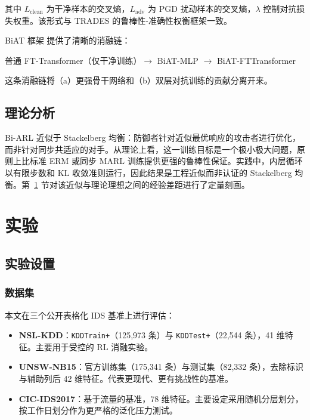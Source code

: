 \documentclass[12pt,a4paper]{ctexart}
\begin{document}
其中 $L_{\text{clean}}$ 为干净样本的交叉熵，$L_{\text{adv}}$ 为 PGD 扰动样本的交叉熵，$\lambda$ 控制对抗损失权重。该形式与 TRADES 的鲁棒性-准确性权衡框架一致。

BiAT 框架 提供了清晰的消融链：
\begin{center}
普通 FT-Transformer（仅干净训练）$\to$ BiAT-MLP $\to$ BiAT-FTTransformer
\end{center}

这条消融链将（a）更强骨干网络和（b）双层对抗训练的贡献分离开来。

\subsection{理论分析}

Bi-ARL 近似于 Stackelberg 均衡：防御者针对近似最优响应的攻击者进行优化，而非针对同步共适应的对手。从理论上看，这一训练目标是一个极小极大问题，原则上比标准 ERM 或同步 MARL 训练提供更强的鲁棒性保证。实践中，内层循环以有限步数和 KL 收敛准则运行，因此结果是工程近似而非认证的 Stackelberg 均衡。第~\ref{sec:experiments_cn} 节对该近似与理论理想之间的经验差距进行了定量刻画。

\section{实验}
\label{sec:experiments_cn}

\subsection{实验设置}

\subsubsection{数据集}

本文在三个公开表格化 IDS 基准上进行评估：
\begin{itemize}
    \item \textbf{NSL-KDD}：\texttt{KDDTrain+}（125,973 条）与 \texttt{KDDTest+}（22,544 条），41 维特征\cite{tavallaee2009nslkdd}。主要用于受控的 RL 消融实验。
    \item \textbf{UNSW-NB15}：官方训练集（175,341 条）与测试集（82,332 条），去除标识与辅助列后 42 维特征\cite{moustafa2015unswnb15}。代表更现代、更有挑战性的基准。
    \item \textbf{CIC-IDS2017}：基于流量的基准，78 维特征\cite{sharafaldin2018cicids2017}。主要设定采用随机分层划分，按工作日划分作为更严格的泛化压力测试。
\end{itemize}
\end{document}
